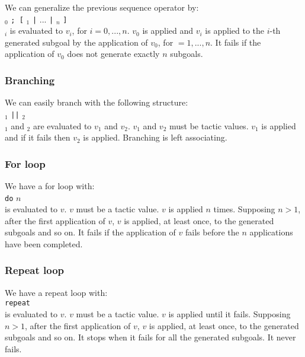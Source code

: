 We can generalize the previous sequence operator by:\\

{\tacexpr}$_0$ {\tt ; [} {\tacexpr}$_1$ {\tt |} $...$ {\tt |}
{\tacexpr}$_n$ {\tt ]}\\

{\tacexpr}$_i$ is evaluated to $v_i$, for $i=0,...,n$. $v_0$ is
applied and $v_i$ is applied to the $i$-th generated subgoal by the
application of $v_0$, for $=1,...,n$. It fails if the application of
$v_0$ does not generate exactly $n$ subgoals.

\subsubsection{Branching}

We can easily branch with the following structure:\\

{\tacexpr}$_1$ {\tt ||} {\tacexpr}$_2$\\

{\tacexpr}$_1$ and {\tacexpr}$_2$ are evaluated to $v_1$ and
$v_2$. $v_1$ and $v_2$ must be tactic values. $v_1$ is applied and if
it fails then $v_2$ is applied. Branching is left associating.

\subsubsection{For loop}

We have a for loop with:\\

{\tt do} $n$ {\tacexpr}\\

{\tacexpr} is evaluated to $v$. $v$ must be a tactic value. $v$ is applied $n$
times. Supposing $n>1$, after the first application of $v$, $v$ is applied, at
least once, to the generated subgoals and so on. It fails if the application of
$v$ fails before the $n$ applications have been completed.

\subsubsection{Repeat loop}

We have a repeat loop with:\\

{\tt repeat} {\tacexpr}\\

{\tacexpr} is evaluated to $v$. $v$ must be a tactic value. $v$ is
applied until it fails. Supposing $n>1$, after the first application
of $v$, $v$ is applied, at least once, to the generated subgoals and
so on. It stops when it fails for all the generated subgoals. It never
fails.

